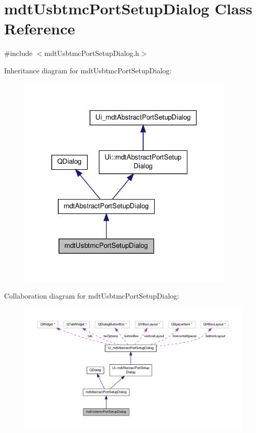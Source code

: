 \hypertarget{classmdt_usbtmc_port_setup_dialog}{\section{mdt\-Usbtmc\-Port\-Setup\-Dialog Class Reference}
\label{classmdt_usbtmc_port_setup_dialog}
}


{\ttfamily \#include $<$mdt\-Usbtmc\-Port\-Setup\-Dialog.\-h$>$}



Inheritance diagram for mdt\-Usbtmc\-Port\-Setup\-Dialog\-:\nopagebreak
\begin{figure}[H]
\begin{center}
\leavevmode
\includegraphics[width=292pt]{classmdt_usbtmc_port_setup_dialog__inherit__graph}
\end{center}
\end{figure}


Collaboration diagram for mdt\-Usbtmc\-Port\-Setup\-Dialog\-:\nopagebreak
\begin{figure}[H]
\begin{center}
\leavevmode
\includegraphics[width=350pt]{classmdt_usbtmc_port_setup_dialog__coll__graph}
\end{center}
\end{figure}
